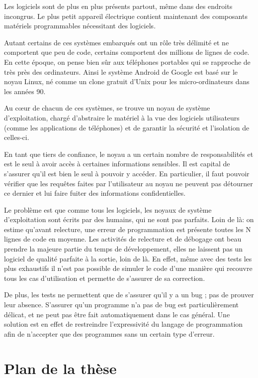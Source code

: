 Les logiciels sont de plus en plus présents partout, même dans des endroits
incongrus. Le plus petit appareil électrique contient maintenant des composants
matériels programmables nécessitant des logiciels.

Autant certains de ces systèmes embarqués ont un rôle très délimité et ne
comportent que peu de code, certains comportent des millions de lignes de code.
En cette époque, on pense bien sûr aux téléphones portables qui se rapproche
de très près des ordinateurs. Ainsi le système Android de Google est basé sur le
noyau Linux, né comme un clone gratuit d'Unix pour les micro-ordinateurs dans
les années 90.

Au cœur de chacun de ces systèmes, se trouve un noyau de système d'exploitation,
chargé d'abstraire le matériel à la vue des logiciels utilisateurs (comme les
applications de téléphones) et de garantir la sécurité et l'isolation de
celles-ci.

En tant que tiers de confiance, le noyau a un certain nombre de responsabilités
et est le seul à avoir accès à certaines informations sensibles. Il est capital
de s'assurer qu'il est bien le seul à pouvoir y accéder. En particulier, il faut
pouvoir vérifier que les requêtes faites par l'utilisateur au noyau ne peuvent
pas détourner ce dernier et lui faire fuiter des informations confidentielles.

Le problème est que comme tous les logiciels, les noyaux de système
d'exploitation sont écrits par des humains, qui ne sont pas parfaits. Loin de
là: on estime qu'avant relecture, une erreur de programmation est présente
toutes les N lignes de code en moyenne. Les activités de relecture et de
débogage ont beau prendre la majeure partie du temps de développement, elles ne
laissent pas un logiciel de qualité parfaite à la sortie, loin de là. En effet,
même avec des tests les plus exhaustifs il n'est pas possible de simuler le code
d'une manière qui recouvre tous les cas d'utilisation et permette de s'assurer
de sa correction.

De plus, les tests ne permettent que de s'assurer qu'il y a un bug ; pas de
prouver leur absence. S'assurer qu'un programme n'a pas de bug est
particulièrement délicat, et ne peut pas être fait automatiquement dans le cas
général. Une solution est en effet de restreindre l'expressivité du langage de
programmation afin de n'accepter que des programmes sans un certain type
d'erreur.

\section{Plan de la thèse}

